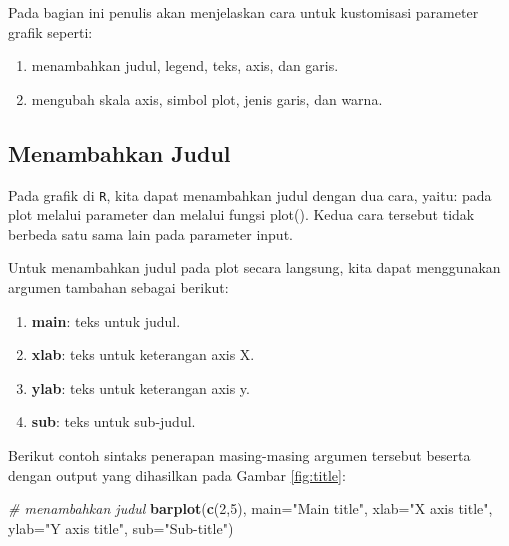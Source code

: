 \documentclass[]{book}
\newenvironment{Shaded}{\begin{snugshade}}{\end{snugshade}}
\newcommand{\KeywordTok}[1]{\textcolor[rgb]{0.13,0.29,0.53}{\textbf{#1}}}
\newcommand{\DataTypeTok}[1]{\textcolor[rgb]{0.13,0.29,0.53}{#1}}
\newcommand{\DecValTok}[1]{\textcolor[rgb]{0.00,0.00,0.81}{#1}}
\newcommand{\StringTok}[1]{\textcolor[rgb]{0.31,0.60,0.02}{#1}}
\newcommand{\CommentTok}[1]{\textcolor[rgb]{0.56,0.35,0.01}{\textit{#1}}}
\newcommand{\NormalTok}[1]{#1}
\providecommand{\tightlist}{%
  \setlength{\itemsep}{0pt}\setlength{\parskip}{0pt}}
\begin{document}
Pada bagian ini penulis akan menjelaskan cara untuk kustomisasi
parameter grafik seperti:

\begin{enumerate}
\def\labelenumi{\alph{enumi}.}
\tightlist
\item
  menambahkan judul, legend, teks, axis, dan garis.
\item
  mengubah skala axis, simbol plot, jenis garis, dan warna.
\end{enumerate}

\subsection{Menambahkan Judul}\label{menambahkan-judul}

Pada grafik di \texttt{R}, kita dapat menambahkan judul dengan dua cara,
yaitu: pada plot melalui parameter dan melalui fungsi plot(). Kedua cara
tersebut tidak berbeda satu sama lain pada parameter input.

Untuk menambahkan judul pada plot secara langsung, kita dapat
menggunakan argumen tambahan sebagai berikut:

\begin{enumerate}
\def\labelenumi{\alph{enumi}.}
\tightlist
\item
  \textbf{main}: teks untuk judul.
\item
  \textbf{xlab}: teks untuk keterangan axis X.
\item
  \textbf{ylab}: teks untuk keterangan axis y.
\item
  \textbf{sub}: teks untuk sub-judul.
\end{enumerate}

Berikut contoh sintaks penerapan masing-masing argumen tersebut beserta
dengan output yang dihasilkan pada Gambar \ref{fig:title}:

\begin{Shaded}
\begin{Highlighting}[]
\CommentTok{# menambahkan judul}
\KeywordTok{barplot}\NormalTok{(}\KeywordTok{c}\NormalTok{(}\DecValTok{2}\NormalTok{,}\DecValTok{5}\NormalTok{), }\DataTypeTok{main=}\StringTok{"Main title"}\NormalTok{,}
        \DataTypeTok{xlab=}\StringTok{"X axis title"}\NormalTok{,}
        \DataTypeTok{ylab=}\StringTok{"Y axis title"}\NormalTok{,}
        \DataTypeTok{sub=}\StringTok{"Sub-title"}\NormalTok{)}
\end{Highlighting}
\end{Shaded}
\end{document}
